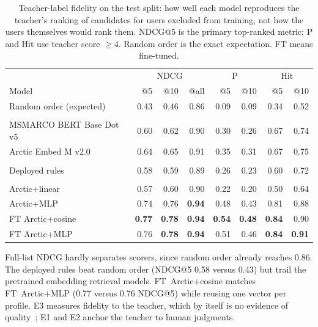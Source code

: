 \documentclass[runningheads,a4paper]{llncs}
\newcommand{\model}[1]{{\hyphenpenalty=10000 \exhyphenpenalty=10000 \textsf{#1}}}
\begin{document}
\begin{table}[!tb]
\caption{Teacher-label fidelity on the test split: how well each model
reproduces the teacher's ranking of candidates for users excluded from
training, not how the users themselves would rank them. NDCG@5 is the primary
top-ranked metric; P and Hit use teacher score $\geq4$. Random order is the
exact expectation. FT means fine-tuned.}
\label{tab:fidelity-ecir}
\centering
\footnotesize
\setlength{\tabcolsep}{3pt}
\renewcommand{\arraystretch}{1.05}
\begin{tabular}{lrrrrrrr}
\toprule
& \multicolumn{3}{c}{NDCG} & \multicolumn{2}{c}{P} & \multicolumn{2}{c}{Hit} \\
Model & @5 & @10 & @all & @5 & @10 & @5 & @10 \\
\midrule
Random order (expected) & 0.43 & 0.46 & 0.86 & 0.09 & 0.09 & 0.34 & 0.52 \\
\addlinespace[2pt]
\multicolumn{8}{l}{\textbf{Pretrained embedder baselines (cosine)}} \\
\model{MSMARCO BERT Base Dot v5} & 0.60 & 0.62 & 0.90 & 0.30 & 0.26 & 0.67 & 0.74 \\
\model{Arctic Embed M v2.0} & 0.64 & 0.65 & 0.91 & 0.35 & 0.31 & 0.67 & 0.75 \\
\addlinespace[2pt]
\multicolumn{8}{l}{\textbf{Existing task baseline}} \\
Deployed rules & 0.58 & 0.59 & 0.89 & 0.26 & 0.23 & 0.60 & 0.72 \\
\addlinespace[2pt]
\multicolumn{8}{l}{\textbf{Our models}} \\
\model{Arctic+linear} & 0.57 & 0.60 & 0.90 & 0.22 & 0.20 & 0.50 & 0.64 \\
\model{Arctic+MLP} & 0.74 & 0.76 & \textbf{0.94} & 0.48 & 0.43 & 0.81 & 0.88 \\
\model{FT Arctic+cosine} & \textbf{0.77} & \textbf{0.78} & \textbf{0.94} & \textbf{0.54} & \textbf{0.48} & \textbf{0.84} & 0.90 \\
\model{FT Arctic+MLP} & 0.76 & \textbf{0.78} & \textbf{0.94} & 0.51 & 0.46 & \textbf{0.84} & \textbf{0.91} \\
\bottomrule
\end{tabular}
\end{table}

Full-list NDCG hardly separates scorers, since random order already reaches
0.86. The deployed rules beat random order (NDCG@5 0.58 versus 0.43) but trail
the pretrained embedding retrieval models.
\model{FT~Arctic+cosine} matches \model{FT~Arctic+MLP} (0.77 versus 0.76 NDCG@5)
while reusing one vector per profile. E3 measures fidelity to the
teacher, which by itself is no evidence of
quality~\cite{dietz2025judges,soboroff2025judgments}; E1 and E2 anchor the
teacher to human judgments.
\end{document}
